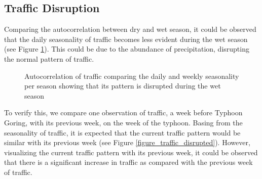 \subsection{Traffic Disruption}
Comparing the autocorrelation between dry and wet season, it could be observed that the daily seasonality of traffic becomes less evident during the wet season (see Figure \ref{figure_autocorr_traffic_season}). This could be due to the abundance of precipitation, disrupting the normal pattern of traffic.



\begin{figure}
    \centering
      \captionsetup{justification=centering}
    \hfill
    \caption{Autocorrelation of traffic comparing the daily and weekly seasonality per season showing that its pattern is disrupted during the wet season}

    \label{figure_autocorr_traffic_season}
\end{figure}


To verify this, we compare one observation of traffic, a week before Typhoon Goring, with its previous week, on the week of the typhoon. Basing from the seasonality of traffic, it is expected that the current traffic pattern would be similar with its previous week (see Figure \ref{figure_traffic_disrupted}). However, visualizing the current traffic pattern with its previous week, it could be observed that there is a significant increase in traffic as compared with the previous week of traffic.



